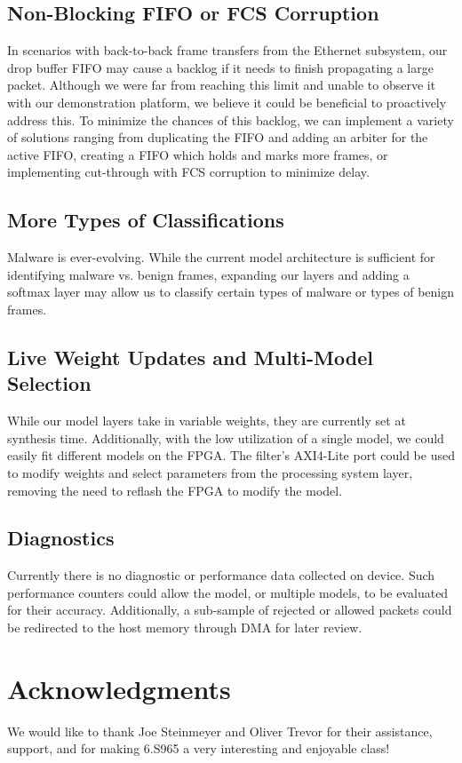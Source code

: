 \documentclass[conference]{IEEEtran}
\begin{document}
\subsection{Non-Blocking FIFO or FCS Corruption}
In scenarios with back-to-back frame transfers from the Ethernet subsystem, our drop buffer FIFO may cause a backlog if it needs to finish propagating a large packet. Although we were far from reaching this limit and unable to observe it with our demonstration platform, we believe it could be beneficial to proactively address this. To minimize the chances of this backlog, we can implement a variety of solutions ranging from duplicating the FIFO and adding an arbiter for the active FIFO, creating a FIFO which holds and marks more frames, or implementing cut-through with FCS corruption to minimize delay.

\subsection{More Types of Classifications}
Malware is ever-evolving. While the current model architecture is sufficient for identifying malware vs. benign frames, expanding our layers and adding a softmax layer may allow us to classify certain types of malware or types of benign frames.

\subsection{Live Weight Updates and Multi-Model Selection}
While our model layers take in variable weights, they are currently set at synthesis time. Additionally, with the low utilization of a single model, we could easily fit different models on the FPGA. The filter's AXI4-Lite port could be used to modify weights and select parameters from the processing system layer, removing the need to reflash the FPGA to modify the model.

\subsection{Diagnostics}
Currently there is no diagnostic or performance data collected
on device. Such performance counters could allow the model,
or multiple models, to be evaluated for their accuracy.
Additionally, a sub-sample of rejected or allowed packets
could be redirected to the host memory through DMA for later review.

\section{Acknowledgments}
We would like to thank Joe Steinmeyer and Oliver Trevor for their assistance, support, and for making 6.S965 a very interesting and enjoyable class!
\end{document}
